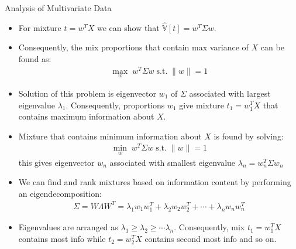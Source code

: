 \documentclass[9pt]{beamer}
\begin{document}
\begin{frame}{Analysis of Multivariate Data}

\begin{itemize}
\setlength{\itemsep}{10pt}
\item For mixture $t=w^TX$ we can show that $\hat{\mathbb{V}}[t]=w^T\Sigma w$. 
\item Consequently, the mix proportions that contain max variance of $X$ can be found as:
\begin{align*}
\max_{w}\; w^T\Sigma w\; \textrm{s.t.}\; \|w\|=1
\end{align*}
\item Solution of this problem is eigenvector $w_1$ of $\Sigma$ associated with largest eigenvalue $\lambda_1$. Consequently, proportions $w_1$ give mixture  $t_1=w_1^TX$ that contains maximum information about $X$. 
\item Mixture that contains minimum information about $X$ is found by solving:
\begin{align*}
\min_{w}\; w^T\Sigma w\; \textrm{s.t.}\; \|w\|=1
\end{align*}
this gives eigenvector $w_n$ associated with smallest eigenvalue $\lambda_n=w^T_n\Sigma w_n$

\item We can find and rank mixtures based on information content by performing an eigendecomposition: 
\begin{align*}
\Sigma = W\Lambda W^T=\lambda_1w_1w_1^T+\lambda_2w_2w_2^T+\cdots + \lambda_n w_nw_n^T
\end{align*}
\item Eigenvalues are arranged as $\lambda_1\geq \lambda_2\geq \cdots \lambda _n$. Consequently, mix $t_1=w_1^TX$ contains most info while $t_2=w_2^TX$ contains second most info and so on. 


\end{itemize}


\end{frame}

\end{document}
